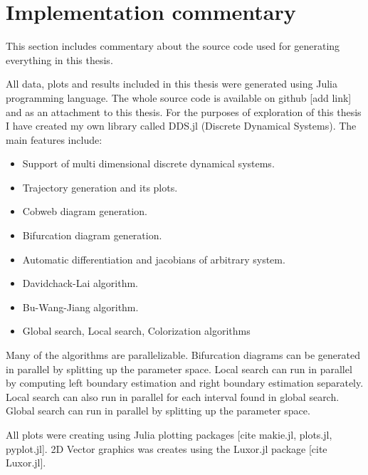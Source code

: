 \section{Implementation commentary}
This section includes commentary about the source code used for generating everything in this thesis.
\par
All data, plots and results included in this thesis were generated using Julia programming language.
The whole source code is available on github [add link] and as an attachment to this thesis.
For the purposes of exploration of this thesis I have created my own library called DDS.jl (Discrete Dynamical Systems).
The main features include:
\begin{itemize}
    \item Support of multi dimensional discrete dynamical systems.
    \item Trajectory generation and its plots.
    \item Cobweb diagram generation.
    \item Bifurcation diagram generation.
    \item Automatic differentiation and jacobians of arbitrary system.
    \item Davidchack-Lai algorithm.
    \item Bu-Wang-Jiang algorithm.
    \item Global search, Local search, Colorization algorithms
\end{itemize}
Many of the algorithms are parallelizable.
Bifurcation diagrams can be generated in parallel by splitting up the parameter space.
Local search can run in parallel by computing left boundary estimation and right boundary estimation separately.
Local search can also run in parallel for each interval found in global search.
Global search can run in parallel by splitting up the parameter space.
\par
All plots were creating using Julia plotting packages [cite makie.jl, plots.jl, pyplot.jl].
2D Vector graphics was creates using the Luxor.jl package [cite Luxor.jl].

\endinput